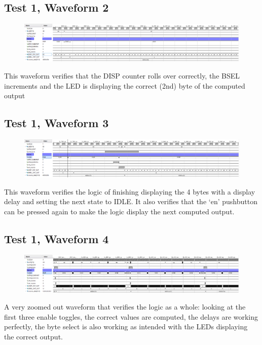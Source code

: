 \documentclass[11pt]{report}
\begin{document}
\subsection*{Test 1, Waveform 2}
\begin{figure}[H]
    \includegraphics[width=\columnwidth]{Assets/test1_2.png}
\end{figure}
This waveform verifies that the DISP counter rolls over correctly, the BSEL increments and the LED is
displaying the correct (2nd) byte of the computed output

\subsection*{Test 1, Waveform 3}
\begin{figure}[H]
    \includegraphics[width=\columnwidth]{Assets/test1_3.png}
\end{figure}
This waveform verifies the logic of finishing displaying the 4 bytes with a display delay and setting the
next state to IDLE. It also verifies that the `en' pushbutton can be pressed again to make the logic display
the next computed output.

\subsection*{Test 1, Waveform 4}
\begin{figure}[H]
    \includegraphics[width=\columnwidth]{Assets/test1_4.png}
\end{figure}
A very zoomed out waveform that verifies the logic as a whole: looking at the first three enable toggles,
the correct values are computed, the delays are working perfectly, the byte select is also working as intended
with the LEDs displaying the correct output.
\end{document}
